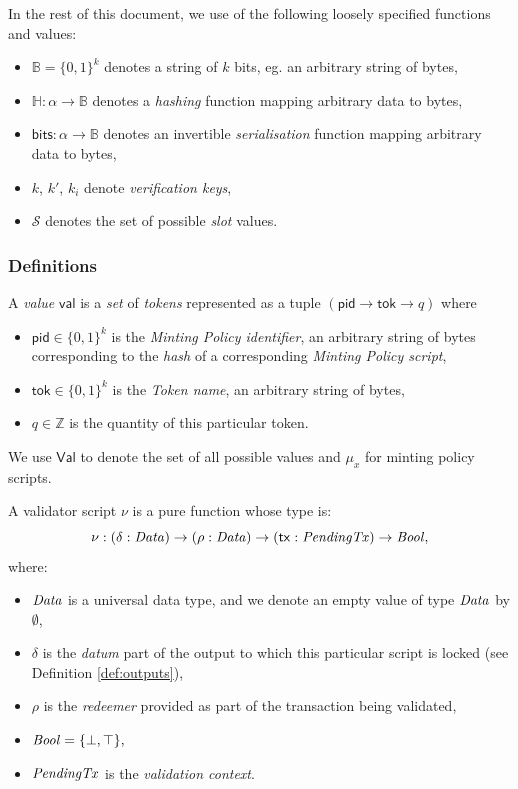 In the rest of this document, we use of the following loosely specified functions and values: 
\begin{itemize}
   \item  $\mathbb{B} = \{0,1\}^k$ denotes a string of $k$ bits, eg. an arbitrary string of bytes, 
    \item $\mathbb{H} : \alpha \to \mathbb{B}$ denotes a \emph{hashing} function mapping arbitrary data to bytes, 
    \item $\mathsf{bits} : \alpha \to \mathbb{B}$ denotes an invertible \emph{serialisation} function mapping arbitrary data to bytes, 
    \item $k$, $k'$, $k_i$ denote \emph{verification keys},
   \item  $\mathcal{S}$ denotes the set of possible \emph{slot} values. 
\end{itemize}

\subsubsection{Definitions}

\begin{definition}[Value]

A \emph{value} $\mathsf{val}$ is a \emph{set} of \emph{tokens} represented as a tuple $(\mathsf{pid} \rightarrow \mathsf{tok} \rightarrow q)$ where
\begin{itemize}
    \item $\mathsf{pid} \in \{0,1\}^k$ is the \emph{Minting Policy identifier}, an arbitrary string of bytes corresponding to the \emph{hash} of a corresponding \emph{Minting Policy script},
    \item $\mathsf{tok} \in \{0,1\}^k$ is the \emph{Token name}, an arbitrary string of bytes,
    \item $q \in \mathbb{Z}$ is the quantity of this particular token.
\end{itemize}

\end{definition}

We use $\mathsf{Val}$ to denote the set of all possible values and  $\mu_x$ for minting policy scripts.

\begin{definition}
A validator script $\nu$ is a pure function whose type is:
\[
  \nu : (\delta : \mathit{Data}) \to (\rho : \mathit{Data}) \to (\mathsf{tx} : \mathit{PendingTx})
  \to\mathit{Bool},
\]
where: 
\begin{itemize}
    \item $\mathit{Data}$ is a universal data type, and we denote an empty value of type $\mathit{Data}$ by $\emptyset$,  
    \item $\delta$ is the \emph{datum} part of the output to which this particular script is locked (see Definition \ref{def:outputs}),
    \item $\rho$ is the \emph{redeemer} provided as part of the transaction being validated,
    \item $\mathit{Bool} = \{\bot, \top\},$
    \item $\mathit{PendingTx}$ is the \emph{validation context}.
\end{itemize}
\end{definition}

